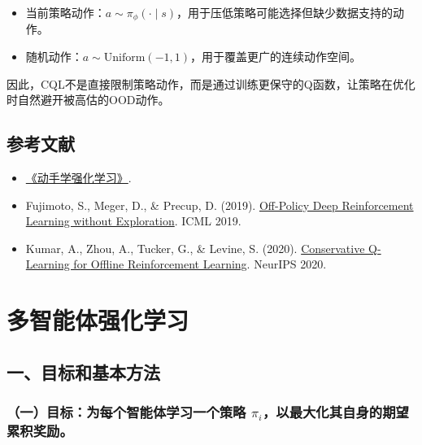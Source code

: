 \begin{itemize}
\tightlist
\item
  当前策略动作：\(a\sim\pi_\phi(\cdot\mid s)\)，用于压低策略可能选择但缺少数据支持的动作。
\item
  随机动作：\(a\sim\mathrm{Uniform}(-1,1)\)，用于覆盖更广的连续动作空间。
\end{itemize}

因此，CQL不是直接限制策略动作，而是通过训练更保守的Q函数，让策略在优化时自然避开被高估的OOD动作。

\hypertarget{ux53c2ux8003ux6587ux732e-64}{%
\subsection{参考文献}\label{ux53c2ux8003ux6587ux732e-64}}

\vspace{0.25em}
\begin{itemize}
\tightlist
\item
  \href{https://hrl.boyuai.com/}{《动手学强化学习》}.
\item
  Fujimoto, S., Meger, D., \& Precup, D. (2019). \href{https://arxiv.org/abs/1812.02900}{Off-Policy Deep Reinforcement Learning without Exploration}. ICML 2019.
\item
  Kumar, A., Zhou, A., Tucker, G., \& Levine, S. (2020). \href{https://arxiv.org/abs/2006.04779}{Conservative Q-Learning for Offline Reinforcement Learning}. NeurIPS 2020.
\end{itemize}

\clearpage

\hypertarget{ux591aux667aux80fdux4f53ux5f3aux5316ux5b66ux4e60}{%
\section{多智能体强化学习}\label{ux591aux667aux80fdux4f53ux5f3aux5316ux5b66ux4e60}}

\hypertarget{ux4e00ux76eeux6807ux548cux57faux672cux65b9ux6cd5}{%
\subsection{一、目标和基本方法}\label{ux4e00ux76eeux6807ux548cux57faux672cux65b9ux6cd5}}

\hypertarget{ux4e00ux76eeux6807ux4e3aux6bcfux4e2aux667aux80fdux4f53ux5b66ux4e60ux4e00ux4e2aux7b56ux7565-pi_iux4ee5ux6700ux5927ux5316ux5176ux81eaux8eabux7684ux671fux671bux7d2fux79efux5956ux52b1}{%
\subsubsection{\texorpdfstring{（一）目标：为每个智能体学习一个策略 \(\pi_i\)，以最大化其自身的期望累积奖励。}{（一）目标：为每个智能体学习一个策略 \textbackslash pi\_i，以最大化其自身的期望累积奖励。}}\label{ux4e00ux76eeux6807ux4e3aux6bcfux4e2aux667aux80fdux4f53ux5b66ux4e60ux4e00ux4e2aux7b56ux7565-pi_iux4ee5ux6700ux5927ux5316ux5176ux81eaux8eabux7684ux671fux671bux7d2fux79efux5956ux52b1}}

